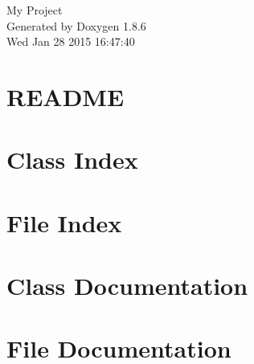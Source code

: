 \documentclass[twoside]{book}
\newcommand{\clearemptydoublepage}{%
  \newpage{\pagestyle{empty}\cleardoublepage}%
}
\begin{document}
\hypersetup{pageanchor=false}
\begin{titlepage}
\vspace*{7cm}
\begin{center}%
{\Large My Project }\\
\vspace*{1cm}
{\large Generated by Doxygen 1.8.6}\\
\vspace*{0.5cm}
{\small Wed Jan 28 2015 16:47:40}\\
\end{center}
\end{titlepage}
\clearemptydoublepage
\tableofcontents
\clearemptydoublepage
{}
\hypersetup{pageanchor=true}

\chapter{R\-E\-A\-D\-M\-E}
\label{md_README}
\hypertarget{md_README}{}

\chapter{Class Index}

\chapter{File Index}

\chapter{Class Documentation}

















\chapter{File Documentation}


















\newpage
{}
{}
\printindex
\end{document}
